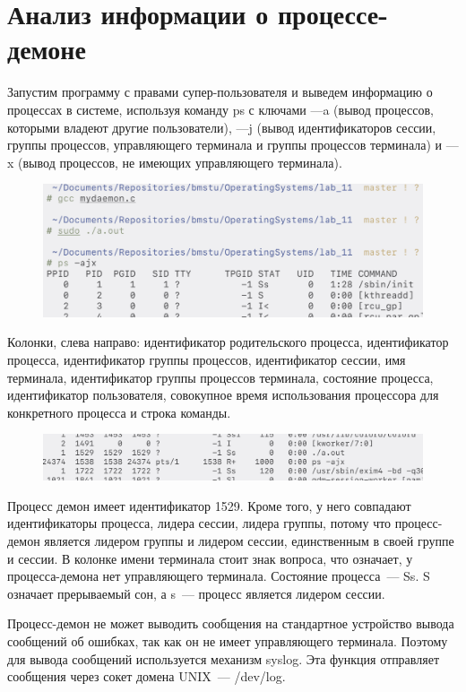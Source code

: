 \section{Анализ информации о процессе-демоне}
Запустим программу с правами супер-пользователя и выведем информацию о процессах в системе, используя команду ps с ключами ---a (вывод процессов, которыми владеют другие пользователи), ---j (вывод идентификаторов сессии, группы процессов, управляющего терминала и группы процессов терминала) и ---x (вывод процессов, не имеющих управляющего терминала).
\begin{figure}[H]
    \centering
    \caption{}
    \includegraphics[scale=.4]{images/scr_01.png}
\end{figure}

Колонки, слева направо: идентификатор родительского процесса, идентификатор процесса, идентификатор группы процессов, идентификатор сессии, имя терминала, идентификатор группы процессов терминала, состояние процесса, идентификатор пользователя, совокупное время использования процессора для конкретного процесса и строка команды.

\begin{figure}[H]
    \centering
    \caption{}
    \includegraphics[scale=.4]{images/scr_02.png}
\end{figure}

Процесс демон имеет идентификатор 1529. Кроме того, у него совпадают идентификаторы процесса, лидера сессии, лидера группы, потому что процесс-демон является лидером группы и лидером сессии, единственным в своей группе и сессии. В колонке имени терминала стоит знак вопроса, что означает, у процесса-демона нет управляющего терминала. Состояние процесса~--- Ss. S означает прерываемый сон, а s~--- процесс является лидером сессии.

Процесс-демон не может выводить сообщения на стандартное устройство вывода сообщений об ошибках, так как он не имеет управляющего терминала. Поэтому для вывода сообщений используется механизм syslog. Эта функция отправляет сообщения через сокет домена UNIX~--- /dev/log.

